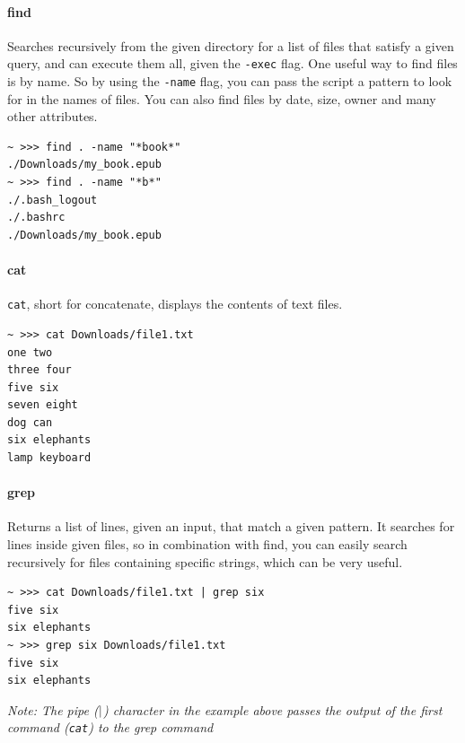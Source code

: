 \hypertarget{find}{%
\paragraph{find}\label{find}}

Searches recursively from the given directory for a list of files that satisfy a given query, and can execute them all, given the \texttt{-exec} flag. One useful way to find files is by name. So by using the \texttt{-name} flag, you can pass the script a pattern to look for in the names of files. You can also find files by date, size, owner and many other attributes.

\begin{verbatim}
~ >>> find . -name "*book*"
./Downloads/my_book.epub
~ >>> find . -name "*b*"
./.bash_logout
./.bashrc
./Downloads/my_book.epub
\end{verbatim}

\hypertarget{cat}{%
\paragraph{cat}\label{cat}}

\texttt{cat}, short for concatenate, displays the contents of text files.

\begin{verbatim}
~ >>> cat Downloads/file1.txt
one two
three four
five six
seven eight
dog can
six elephants
lamp keyboard
\end{verbatim}

\hypertarget{grep}{%
\paragraph{grep}\label{grep}}

Returns a list of lines, given an input, that match a given pattern. It searches for lines inside given files, so in combination with find, you can easily search recursively for files containing specific strings, which can be very useful.


\pagebreak

\begin{verbatim}
~ >>> cat Downloads/file1.txt | grep six
five six
six elephants
~ >>> grep six Downloads/file1.txt
five six
six elephants
\end{verbatim}

\emph{Note: The pipe (\(\space\mid\space\)) character in the example above passes the output of the first command (\texttt{cat}) to the grep command}


